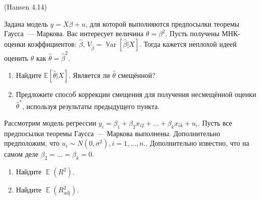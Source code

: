 \documentclass[12pt]{article}
\DeclareMathOperator{\Var}{\mathbb{V}ar}
\DeclareMathOperator{\E}{\mathbb{E}}
\newcommand{\hb}{\hat{\beta}}
\renewcommand{\u}{u}
\newcommand{\adj}{\text{adj}}
\begin{document}
\begin{problem}(Hansen 4.14)

Задана модель $y = X \beta + u$, для которой выполняются предпосылки теоремы Гаусса~--- Маркова. Вас интересует величина $\theta = \beta^2$. Пусть получены МНК-оценки коэффициентов: $\hb$, $V_{\hb} = \Var [\hb | X]$. Тогда кажется неплохой идеей оценить $\theta$ как $\hat{\theta} = \hb^2$.

\begin{enumerate}
    \item Найдите $\mathbb{E} [\hat{\theta} | X]$. Является ли $\hat{\theta}$ смещённой?
    
    \item Предложите способ коррекции смещения для получения несмещённой оценки  $\hat{\theta}^*$, используя результаты предыдущего пункта.
\end{enumerate}

\end{problem}

\begin{problem}
Рассмотрим модель регрессии $y_i = \beta_1 + \beta_2x_{i2} + ... +\beta_kx_{ik} + \u_i$. Пусть все предпосылки теоремы Гаусса~--- Маркова выполнены. Дополнительно предположим, что $\u_i \sim N(0,\sigma^2), i=1,...,n.$. Дополнительно известно, что на самом деле $\beta_2 = ... = \beta_k = 0$.
\begin{enumerate}
\item Найдите $\E(R^2)$.
\item Найдите $\E(R^2_{\adj})$.
\end{enumerate}
\end{problem}
\end{document}
